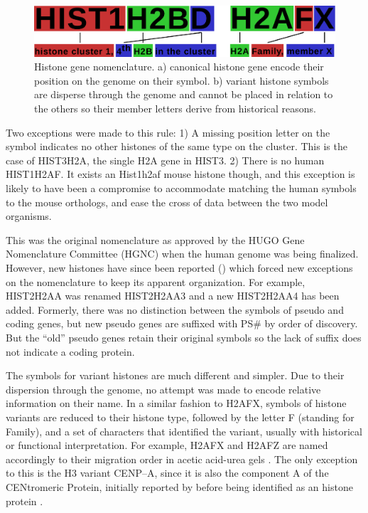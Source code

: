 \documentclass[10pt,a4paper,onecolumn,article]{memoir}
\begin{document}
      \begin{figure}
        \centering
        \includegraphics[width=\textwidth]{nomenclature-schematic.pdf}
        \caption{Histone gene nomenclature. a) canonical histone gene encode their position
                 on the genome on their symbol. b) variant histone symbols are disperse through
                 the genome and cannot be placed in relation to the others so their member
                 letters derive from historical reasons.}
        \label{fig:nomenclature}
      \end{figure}

      Two exceptions were made to this rule: 1) A missing position letter on the symbol indicates
      no other histones of the same type on the cluster. This is the case of HIST3H2A, the
      single H2A gene in HIST3. 2) There is no human HIST1H2AF. It exists an Hist1h2af mouse
      histone though, and this exception is likely to have been a compromise to accommodate
      matching the human symbols to the mouse orthologs, and ease the cross of data between the
      two model organisms.

      This was the original nomenclature as approved by the HUGO Gene Nomenclature Committee (HGNC)
      when the human genome was being finalized. However, new histones have since been
      reported () which forced new exceptions on the
      nomenclature to keep its apparent organization. For example, HIST2H2AA was renamed
      HIST2H2AA3 and a new HIST2H2AA4 has been added. Formerly, there was no distinction
      between the symbols of pseudo and coding genes, but new pseudo genes are suffixed with
      PS\# by order of discovery. But the ``old'' pseudo genes retain their original symbols
      so the lack of suffix does not indicate a coding protein.

      The symbols for variant histones are much different and simpler. Due to their dispersion
      through the genome, no attempt was made to encode relative information on their name. In
      a similar fashion to H2AFX, symbols of histone variants are reduced to their histone type,
      followed by the letter F (standing for Family), and a set of characters that identified
      the variant, usually with historical or functional interpretation. For example, H2AFX and
      H2AFZ are named accordingly to their migration order in acetic acid-urea gels
      \citep{HTwoA-first-variants}.
      The only exception to this is the H3 variant CENP--A, since it is also the component A
      of the CENtromeric Protein, initially reported by \cite{CENPA-first-report} before being
      identified as an histone protein \citep{CENPA-copurifies-histones, CENPA-sequence-analysis}.
\end{document}
